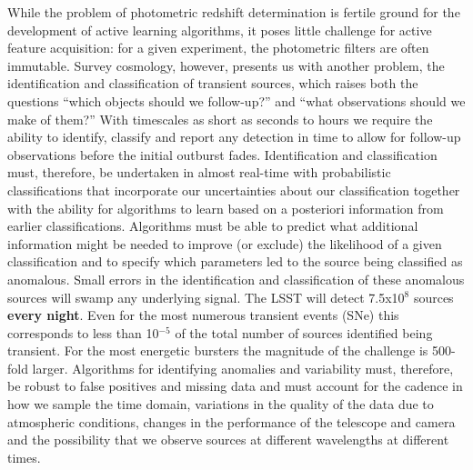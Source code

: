 \documentclass[prd,nofootbib,floatfix,11pt,tightenlines]{revtex4}
\begin{document}
While the problem of photometric redshift determination is fertile ground for
the development of active learning algorithms, it poses little challenge for
active feature acquisition: for a given experiment, the photometric filters are
often immutable. Survey cosmology, however, presents us with another 
problem, the identification and classification of transient sources,
which raises both the questions ``which objects should we
follow-up?'' and ``what observations should we make of them?''
With timescales as short as seconds to hours we require the ability to
identify, classify and report any detection in time to allow for
follow-up observations before the initial outburst
fades. Identification and classification must, therefore, be
undertaken in almost real-time with probabilistic classifications that
incorporate our uncertainties about our classification together with
the ability for algorithms to learn based on a posteriori information
from earlier classifications.  Algorithms must be able to predict what
additional information might be needed to improve (or exclude) the
likelihood of a given classification and to specify which parameters
led to the source being classified as anomalous. Small errors in the
identification and classification of these anomalous sources will
swamp any underlying signal. The LSST will detect 7.5x10$^8$ sources
{\bf every night}. Even for the most numerous transient events (SNe)
this corresponds to less than 10$^{-5}$ of the total number of sources
identified being transient. For the most energetic bursters the
magnitude of the challenge is 500-fold larger.  Algorithms for
identifying anomalies and variability must, therefore, be robust to
false positives and missing data and must account for the cadence in
how we sample the time domain, variations in the quality of the data
due to atmospheric conditions, changes in the performance of the
telescope and camera and the possibility that we observe sources at
different wavelengths at different times.
\end{document}
